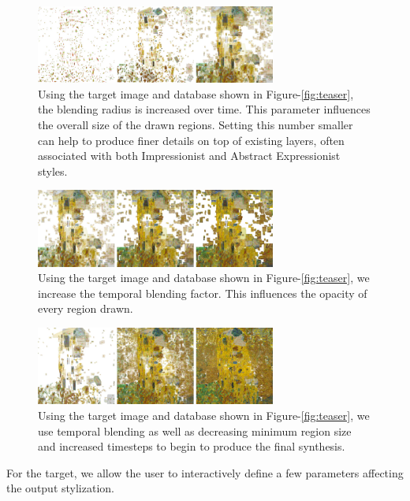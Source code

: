 \documentclass[a4paper,11pt,final]{ThesisStyle}
\begin{document}
\begin{figure}[ht]
  \centering
  \includegraphics[width=3.1in]{images/blending-radius-2.png}
  
  \caption{Using the target image and database shown in Figure-\ref{fig:teaser}, the blending radius is increased over time.  This parameter influences the overall size of the drawn regions.  Setting this number smaller can help to produce finer details on top of existing layers, often associated with both Impressionist and Abstract Expressionist styles.}
  \label{fig:blending-radius}
\end{figure}
\begin{figure}[ht]
  \centering
  \includegraphics[width=3.1in]{images/temporal-blending.png}
  
  \caption{Using the target image and database shown in Figure-\ref{fig:teaser}, we increase the temporal blending factor.  This influences the opacity of every region drawn. }
  \label{fig:temporal-blending}
\end{figure}
\begin{figure}[ht]
  \centering
  \includegraphics[width=3.1in]{images/temporal-blending-changing-params.png}
  
  \caption{Using the target image and database shown in Figure-\ref{fig:teaser}, we use temporal blending as well as decreasing minimum region size and increased timesteps to begin to produce the final synthesis.}
  \label{fig:temporal-blending-changing-parameters}
\end{figure}
For the target, we allow the user to interactively define a few parameters affecting the output stylization.  
\end{document}
